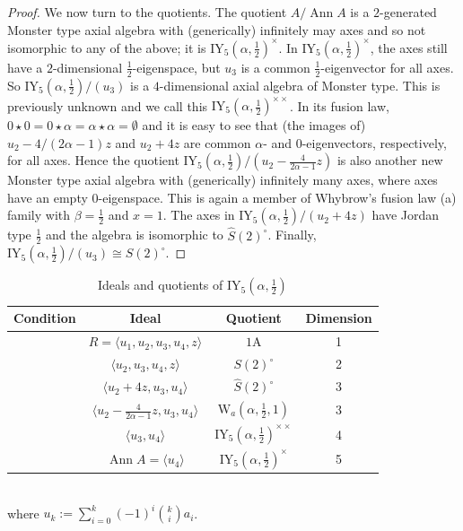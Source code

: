 \documentclass[11pt, a4paper]{article}
\theoremstyle{plain}
\theoremstyle{definition}
\newcommand\al{\alpha}
\newcommand\bt{\beta}
\newcommand\la{\langle}
\newcommand\ra{\rangle}
\DeclareMathOperator{\Ann}{Ann}
\newcommand{\A}{\mathrm{A}}
\newcommand{\IY}{\mathrm{IY}}
\newcommand{\Cl}{\widehat{S}(2)^\circ} %
\newcommand{\0}{\overline{0}}
\newcommand{\2}{\overline{2}}
\newcommand{\1}{\mathbbm{1}}
\begin{document}
\begin{proof}
We now turn to the quotients.  The quotient $A/\Ann A$ is a $2$-generated Monster type axial algebra with (generically) infinitely may axes and so not isomorphic to any of the above; it is $\IY_5(\al, \frac{1}{2})^\times$.  In $\IY_5(\al, \frac{1}{2})^\times$, the axes still have a $2$-dimensional $\frac{1}{2}$-eigenspace, but $u_3$ is a common $\frac{1}{2}$-eigenvector for all axes.  So $\IY_5(\al,\frac{1}{2})/(u_3)$ is a $4$-dimensional axial algebra of Monster type.  This is previously unknown and we call this $\IY_5(\al,\frac{1}{2})^{\times\times}$.  In its fusion law, $0 \star 0 = 0 \star \al = \al \star \al = \emptyset$ and it is easy to see that (the images of) $u_2 - 4/(2\al-1)z$ and $u_2 + 4z$ are common $\al$- and $0$-eigenvectors, respectively, for all axes.  Hence the quotient $\IY_5(\al,\frac{1}{2})/(u_2-\frac{4}{2\al-1}z)$ is also another new Monster type axial algebra with (generically) infinitely many axes, where axes have an empty $0$-eigenspace.  This is again a member of Whybrow's fusion law (a) family with $\bt=\frac{1}{2}$ and $x=1$.  The axes in  $\IY_5(\al,\frac{1}{2})/(u_2 +4z)$ have Jordan type $\frac{1}{2}$ and the algebra is isomorphic to $\Cl$.  Finally, $\IY_5(\al,\frac{1}{2})/(u_3) \cong S(2)^\circ$.
\end{proof}



\begin{table}[h!tb]
\renewcommand{\arraystretch}{1.5}
\centering
\footnotesize
\begin{tabular}{c|c|c|c}
\hline
Condition & Ideal & Quotient & Dimension\\
\hline
& $R = \la u_1, u_2, u_3, u_4, z\ra$ & $1\A$ & 1 \\
& $\la u_2, u_3, u_4, z\ra$ & $S(2)^\circ$ & 2 \\
& $\la u_2 + 4z, u_3, u_4\ra$ & $\Cl$ & 3 \\
& $\la u_2 -\frac{4}{2\al-1}z, u_3, u_4\ra$ & $\mathrm{W}_a(\al, \frac{1}{2}, 1)$  & 3 \\
& $\la u_3, u_4\ra$ & $\IY_5(\al,\frac{1}{2})^{\times\times}$ & 4 \\
& $\Ann A = \la u_4 \ra$ & $\IY_5(\al,\frac{1}{2})^\times$ & 5
\end{tabular}\\
	\vspace{5pt}
	where $u_k := \sum_{i=0}^k (-1)^i \binom{k}{i}a_i$.
\caption{Ideals and quotients of $\IY_5(\al, \frac{1}{2})$}\label{tab:IY5props}
\end{table}
\end{document}

